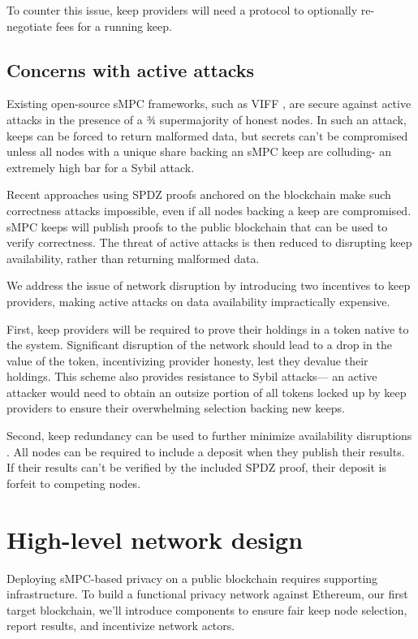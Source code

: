 \documentclass[11pt]{article}
\begin{document}
To counter this issue, keep providers will need a protocol to
optionally re-negotiate fees for a running keep.

\subsection{Concerns with active attacks}
\label{activeAttacks}

Existing open-source sMPC frameworks, such as VIFF \cite{viff}, are
secure against active attacks in the presence of a ¾ supermajority of
honest nodes. In such an attack, keeps can be forced to return
malformed data, but secrets can't be compromised unless all nodes with
a unique share backing an sMPC keep are colluding- an extremely high
bar for a Sybil attack.

Recent approaches using SPDZ proofs \cite{spdz} anchored on the
blockchain \cite{bitcoinSmpc, blockchainMultipartyComputation} make
such correctness attacks impossible, even if all nodes backing a keep
are compromised. sMPC keeps will publish proofs to the public
blockchain that can be used to verify correctness. The threat of
active attacks is then reduced to disrupting keep availability, rather
than returning malformed data.

We address the issue of network disruption by introducing two
incentives to keep providers, making active attacks on data
availability impractically expensive.

First, keep providers will be required to prove their holdings in a
token native to the system. Significant disruption of the network
should lead to a drop in the value of the token, incentivizing
provider honesty, lest they devalue their holdings. This scheme also
provides resistance to Sybil attacks--- an active attacker would need to
obtain an outsize portion of all tokens locked up by keep providers to
ensure their overwhelming selection backing new keeps.

Second, keep redundancy can be used to further minimize availability
disruptions \cite{blockchainMultipartyComputation}. All nodes can be
required to include a deposit when they publish their results. If
their results can't be verified by the included SPDZ proof, their
deposit is forfeit to competing nodes.

\section{High-level network design}

Deploying sMPC-based privacy on a public blockchain requires
supporting infrastructure. To build a functional privacy network
against Ethereum, our first target blockchain, we'll introduce
components to ensure fair keep node selection, report results, and
incentivize network actors.
\end{document}
